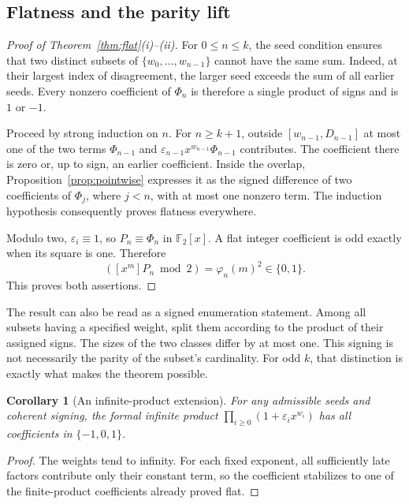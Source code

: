 \documentclass[11pt,letterpaper]{article}
\numberwithin{equation}{section}
\newtheorem{corollary}[theorem]{Corollary}
\theoremstyle{definition}
\theoremstyle{remark}
\newcommand{\F}{\mathbb F}
\newcommand{\eps}{\varepsilon}
\newcommand{\coef}[2]{[x^{#1}]#2}
\begin{document}
\subsection{Flatness and the parity lift}

\begin{proof}[Proof of Theorem~\ref{thm:flat}(i)--(ii)]
For $0\le n\le k$, the seed condition ensures that two distinct subsets of
$\{w_0,\ldots,w_{n-1}\}$ cannot have the same sum. Indeed, at their largest
index of disagreement, the larger seed exceeds the sum of all earlier
seeds. Every nonzero coefficient of $\Phi_n$ is therefore a single product
of signs and is $1$ or $-1$.

Proceed by strong induction on $n$. For $n\ge k+1$, outside
$[w_{n-1},D_{n-1}]$ at most one of the two terms $\Phi_{n-1}$ and
$\eps_{n-1}x^{w_{n-1}}\Phi_{n-1}$ contributes. The coefficient there is zero
or, up to sign, an earlier coefficient. Inside the overlap,
Proposition~\ref{prop:pointwise} expresses it as the signed difference of
two coefficients of $\Phi_j$, where $j<n$, with at most one nonzero term.
The induction hypothesis consequently proves flatness everywhere.

Modulo two, $\eps_i\equiv1$, so $P_n\equiv\Phi_n$ in $\F_2[x]$. A flat
integer coefficient is odd exactly when its square is one. Therefore
\begin{equation}
 (\coef{m}{P_n}\bmod2)=\varphi_n(m)^2\in\{0,1\}.
 \label{eq:paritylift}
\end{equation}
This proves both assertions.
\end{proof}

The result can also be read as a signed enumeration statement. Among all
subsets having a specified weight, split them according to the product of
their assigned signs. The sizes of the two classes differ by at most one.
This signing is not necessarily the parity of the subset's cardinality. For
odd $k$, that distinction is exactly what makes the theorem possible.

\begin{corollary}[An infinite-product extension]
\label{cor:infinite}
For any admissible seeds and coherent signing, the formal infinite product
$\prod_{i\ge0}(1+\eps_i x^{w_i})$ has all coefficients in $\{-1,0,1\}$.
\end{corollary}
\begin{proof}
The weights tend to infinity. For each fixed exponent, all sufficiently
late factors contribute only their constant term, so the coefficient
stabilizes to one of the finite-product coefficients already proved flat.
\end{proof}
\end{document}
